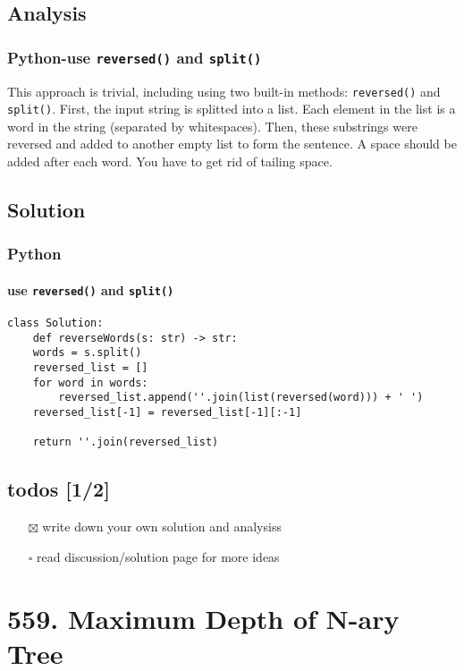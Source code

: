 \documentclass[12pt]{article}
\begin{document}
\subsection{Analysis}
\label{sec:org0bda166}
\subsubsection{Python-use \texttt{reversed()} and \texttt{split()}}
\label{sec:orgab0ffb8}
This approach is trivial, including using two built-in methods: \texttt{reversed()} and \texttt{split()}. First, the input string is splitted into a list. Each element in the list is a word in the string (separated by whitespaces). Then, these substrings were reversed and added to another empty list to form the sentence. A space should be added after each word. You have to get rid of tailing space.
\subsection{Solution}
\label{sec:org4483042}
\subsubsection{Python}
\label{sec:org86ee82e}
\paragraph{use \texttt{reversed()} and \texttt{split()}}
\label{sec:orga2ba887}
\begin{verbatim}
class Solution:
    def reverseWords(s: str) -> str:
	words = s.split()
	reversed_list = []
	for word in words:
	    reversed_list.append(''.join(list(reversed(word))) + ' ')
	reversed_list[-1] = reversed_list[-1][:-1]

	return ''.join(reversed_list)
\end{verbatim}
\subsection{todos [1/2]}
\label{sec:orga8b8ee5}
\begin{itemize}
\item[{$\boxtimes$}] write down your own solution and analysiss
\item[{$\square$}] read discussion/solution page for more ideas
\end{itemize}
\section{559. Maximum Depth of N-ary Tree \label{org8c2b4a3}}
\label{sec:org8193ec2}
\end{document}
